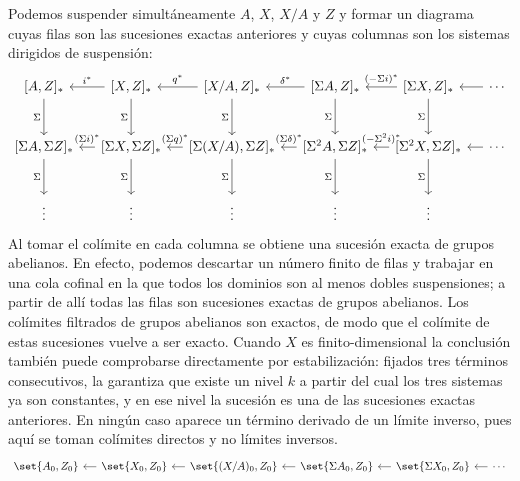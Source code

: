 Podemos suspender simultáneamente $A$, $X$, $X/A$ y $Z$ y formar un diagrama cuyas filas son las sucesiones exactas anteriores y cuyas columnas son los sistemas dirigidos de suspensión:
\[
\begin{tikzcd}[column sep=small, row sep=large]
{[A,Z]_*} \arrow[d,"\Sigma"'] &
{[X,Z]_*} \arrow[l,"i^*"'] \arrow[d,"\Sigma"'] &
{[X/A,Z]_*} \arrow[l,"q^*"'] \arrow[d,"\Sigma"'] &
{[\Sigma A,Z]_*} \arrow[l,"\delta^*"'] \arrow[d,"\Sigma"'] &
{[\Sigma X,Z]_*} \arrow[l,"{(-\Sigma i)^*}"'] \arrow[d,"\Sigma"'] &
\cdots \arrow[l]\\
{[\Sigma A,\Sigma Z]_*} \arrow[d,"\Sigma"'] &
{[\Sigma X,\Sigma Z]_*} \arrow[l,"{(\Sigma i)^*}"'] \arrow[d,"\Sigma"'] &
{[\Sigma(X/A),\Sigma Z]_*} \arrow[l,"{(\Sigma q)^*}"'] \arrow[d,"\Sigma"'] &
{[\Sigma^2A,\Sigma Z]_*} \arrow[l,"{(\Sigma\delta)^*}"'] \arrow[d,"\Sigma"'] &
{[\Sigma^2X,\Sigma Z]_*} \arrow[l,"{(-\Sigma^2i)^*}"'] \arrow[d,"\Sigma"'] &
\cdots \arrow[l]\\
\vdots & \vdots & \vdots & \vdots & \vdots & {}
\end{tikzcd}
\]
Al tomar el colímite en cada columna se obtiene una sucesión exacta de grupos abelianos. En efecto, podemos descartar un número finito de filas y trabajar en una cola cofinal en la que todos los dominios son al menos dobles suspensiones; a partir de allí todas las filas son sucesiones exactas de grupos abelianos. Los colímites filtrados de grupos abelianos son exactos, de modo que el colímite de estas sucesiones vuelve a ser exacto.
Cuando $X$ es finito-dimensional la conclusión también puede comprobarse directamente por estabilización: fijados tres términos consecutivos, la  garantiza que existe un nivel $k$ a partir del cual los tres sistemas ya son constantes, y en ese nivel la sucesión es una de las sucesiones exactas anteriores. En ningún caso aparece un término derivado de un límite inverso, pues aquí se toman colímites directos y no límites inversos.
\[
\begin{tikzcd}[column sep=small, row sep=large]
{\set{A_0,Z_0}} & {\set{X_0,Z_0}} \arrow[l] & {\set{(X/A)_0,Z_0}} \arrow[l] & {\set{\Sigma A_0,Z_0}} \arrow[l] & {\set{\Sigma X_0,Z_0}} \arrow[l] & \cdots \arrow[l]
\end{tikzcd}
\]

